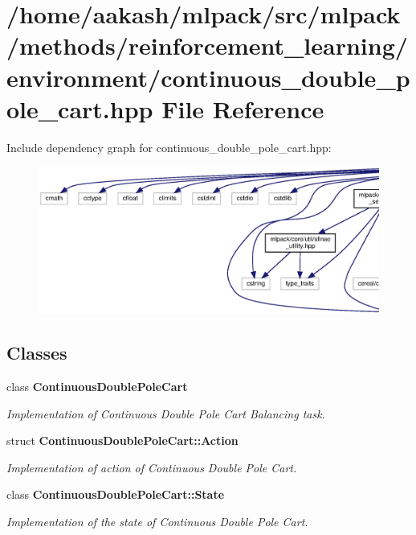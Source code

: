 \section{/home/aakash/mlpack/src/mlpack/methods/reinforcement\+\_\+learning/environment/continuous\+\_\+double\+\_\+pole\+\_\+cart.hpp File Reference}
\label{continuous__double__pole__cart_8hpp}
Include dependency graph for continuous\+\_\+double\+\_\+pole\+\_\+cart.\+hpp\+:
\nopagebreak
\begin{figure}[H]
\begin{center}
\leavevmode
\includegraphics[width=350pt]{continuous__double__pole__cart_8hpp__incl}
\end{center}
\end{figure}
\subsection*{Classes}
\begin{DoxyCompactItemize}
\item 
class \textbf{ Continuous\+Double\+Pole\+Cart}
\begin{DoxyCompactList}\small\item\em Implementation of Continuous Double Pole Cart Balancing task. \end{DoxyCompactList}\item 
struct \textbf{ Continuous\+Double\+Pole\+Cart\+::\+Action}
\begin{DoxyCompactList}\small\item\em Implementation of action of Continuous Double Pole Cart. \end{DoxyCompactList}\item 
class \textbf{ Continuous\+Double\+Pole\+Cart\+::\+State}
\begin{DoxyCompactList}\small\item\em Implementation of the state of Continuous Double Pole Cart. \end{DoxyCompactList}\end{DoxyCompactItemize}
